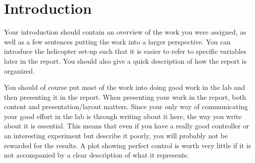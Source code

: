 \section{Introduction}\label{sec:Intro_new}

Your introduction should contain an overview of the work you were assigned, as well as a few sentences putting the work into a larger perspective. You can introduce the helicopter set-up such that it is easier to refer to specific variables later in the report. You should also give a quick description of how the report is organized.

You should of course put most of the work into doing good work in the lab and then presenting it in the report. When presenting your work in the report, both content and presentation/layout matters. Since your only way of communicating your good effort in the lab is through writing about it here, the way you write about it is essential. This means that even if you have a really good controller or an interesting experiment but describe it poorly, you will probably not be rewarded for the results. A plot showing perfect control is worth very little if it is not accompanied by a clear description of what it represents.